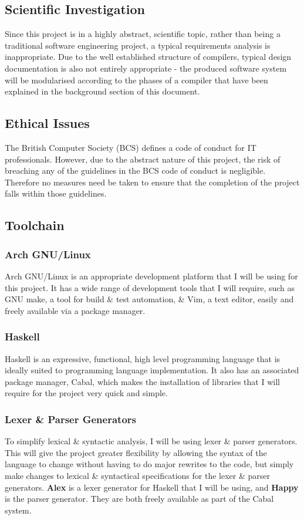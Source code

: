 \documentclass{article}
\begin{document}
\subsection{Scientific Investigation}
Since this project is in a highly abstract, scientific topic, rather than being a traditional software engineering project, a typical requirements analysis is inappropriate. Due to the well established structure of compilers, typical design documentation is also not entirely appropriate - the produced software system will be modularised according to the phases of a compiler that have been explained in the background section of this document.

\subsection{Ethical Issues} %
The British Computer Society (BCS) defines a code of conduct for IT professionals. However, due to the abstract nature of this project, the risk of breaching any of the guidelines in the BCS code of conduct is negligible. Therefore no measures need be taken to ensure that the completion of the project falls within those guidelines.

\subsection{Toolchain}
\subsubsection{Arch GNU/Linux}
Arch GNU/Linux is an appropriate development platform that I will be using for this project. It has a wide range of development tools that I will require, such as GNU make, a tool for build \& test automation, \& Vim, a text editor, easily and freely available via a package manager.

\subsubsection{Haskell}
Haskell is an expressive, functional, high level programming language that is ideally suited to programming language implementation. It also has an associated package manager, Cabal, which makes the installation of libraries that I will require for the project very quick and simple.

\subsubsection{Lexer \& Parser Generators}
To simplify lexical \& syntactic analysis, I will be using lexer \& parser generators. This will give the project greater flexibility by allowing the syntax of the language to change without having to do major rewrites to the code, but simply make changes to lexical \& syntactical specifications for the lexer \& parser generators. \textbf{Alex} is a lexer generator for Haskell that I will be using, and \textbf{Happy} is the parser generator. They are both freely available as part of the Cabal system.
\end{document}
